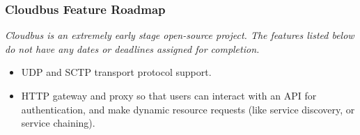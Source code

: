 \begin{frame}
	\frametitle{Cloudbus Feature Roadmap}
	\emph{Cloudbus is an extremely early stage open-source project. The features listed below do not have any dates or deadlines assigned for 
	completion.}\vspace{1em}
	\begin{itemize}
		\item UDP and SCTP transport protocol support.
		\item HTTP gateway and proxy so that users can interact with an API for authentication, and make dynamic resource requests (like service %
		discovery, or service chaining).
	\end{itemize}
\end{frame}